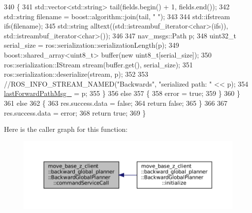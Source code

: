 \begin{DoxyCode}
340         \{
341             std::vector<std::string> tail(fields.begin() + 1, fields.end());
342             std::string filename = boost::algorithm::join(tail, \textcolor{stringliteral}{" "});
343 
344             std::ifstream ifs(filename);
345             std::string alltext((std::istreambuf\_iterator<char>(ifs)), std::istreambuf\_iterator<char>());
346 
347             nav\_msgs::Path p;
348             uint32\_t serial\_size = ros::serialization::serializationLength(p);
349             boost::shared\_array<uint8\_t> buffer(\textcolor{keyword}{new} uint8\_t[serial\_size]);
350             ros::serialization::IStream stream(buffer.get(), serial\_size);
351             ros::serialization::deserialize(stream, p);
352 
353             \textcolor{comment}{//ROS\_INFO\_STREAM\_NAMED("Backwards", "serialized path: " << p);}
354             \hyperlink{classmove__base__z__client_1_1backward__global__planner_1_1BackwardGlobalPlanner_a058da13b9ee6b1d878830503e67de638}{lastForwardPathMsg\_} = p;
355         \}
356         \textcolor{keywordflow}{else}
357         \{
358             error = \textcolor{keyword}{true};
359         \}
360     \}
361     \textcolor{keywordflow}{else}
362     \{
363         res.success.data = \textcolor{keyword}{false};
364         \textcolor{keywordflow}{return} \textcolor{keyword}{false};
365     \}
366 
367     res.success.data = error;
368     \textcolor{keywordflow}{return} \textcolor{keyword}{true};
369 \}
\end{DoxyCode}
Here is the caller graph for this function\+:
\nopagebreak
\begin{figure}[H]
\begin{center}
\leavevmode
\includegraphics[width=350pt]{classmove__base__z__client_1_1backward__global__planner_1_1BackwardGlobalPlanner_a089a3f34a80d7c6540bdf771eaf409f5_icgraph}
\end{center}
\end{figure}
\mbox{\label{classmove__base__z__client_1_1backward__global__planner_1_1BackwardGlobalPlanner_a395d7f10f5e8dfb26fe9809912f29795}} 
